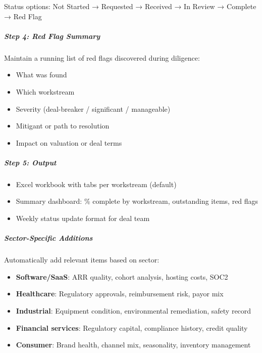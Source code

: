 \documentclass[11pt]{article}
\begin{document}
Status options: Not Started → Requested → Received → In Review → Complete → Red Flag


\subparagraph{Step 4: Red Flag Summary}\mbox{}\par

Maintain a running list of red flags discovered during diligence:

\begin{itemize}[leftmargin=*,itemsep=2pt,topsep=2pt]
\item {} What was found
\item {} Which workstream
\item {} Severity (deal-breaker / significant / manageable)
\item {} Mitigant or path to resolution
\item {} Impact on valuation or deal terms
\end{itemize}

\subparagraph{Step 5: Output}\mbox{}\par

\begin{itemize}[leftmargin=*,itemsep=2pt,topsep=2pt]
\item {} Excel workbook with tabs per workstream (default)
\item {} Summary dashboard: \% complete by workstream, outstanding items, red flags
\item {} Weekly status update format for deal team
\end{itemize}

\subparagraph{Sector-Specific Additions}\mbox{}\par

Automatically add relevant items based on sector:

\begin{itemize}[leftmargin=*,itemsep=2pt,topsep=2pt]
\item {} \textbf{Software/SaaS}: ARR quality, cohort analysis, hosting costs, SOC2
\item {} \textbf{Healthcare}: Regulatory approvals, reimbursement risk, payor mix
\item {} \textbf{Industrial}: Equipment condition, environmental remediation, safety record
\item {} \textbf{Financial services}: Regulatory capital, compliance history, credit quality
\item {} \textbf{Consumer}: Brand health, channel mix, seasonality, inventory management
\end{itemize}
\end{document}
